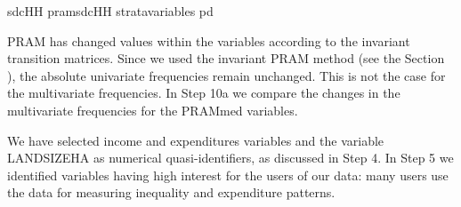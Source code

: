 \documentclass[letterpaper,10pt,english]{sphinxmanual}
\begin{document}
\def\sphinxLiteralBlockLabel{\label{\detokenize{case_studies:code917}}}
%
\begin{sphinxVerbatim}[commandchars=\\\{\},numbers=left,firstnumber=1,stepnumber=1]
sdcHH  pramsdcHH strata\PYGZus{}variables   pd  

\end{sphinxVerbatim}

PRAM has changed values within the variables according to the invariant
transition matrices. Since we used the invariant PRAM method (see
the Section ),
the absolute univariate frequencies remain unchanged.
This is not the case for the multivariate frequencies. In Step 10a we
compare the changes in the multivariate frequencies for the PRAMmed
variables.


We have selected income and expenditures variables and the variable
LANDSIZEHA as numerical quasi-identifiers, as discussed in Step 4. In
Step 5 we identified variables having high interest for the users of our
data: many users use the data for measuring inequality and expenditure
patterns.
\end{document}
